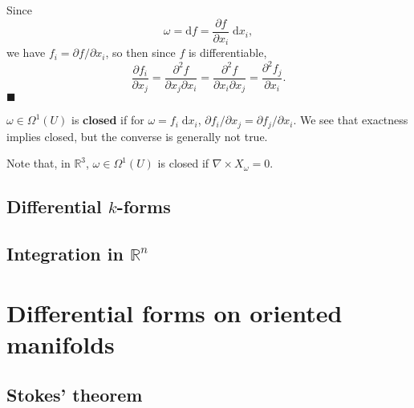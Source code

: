\documentclass[letter-paper]{tufte-book}
\newenvironment{proof}[1][Proof]{\begin{trivlist}
\item[\hskip \labelsep {\bfseries #1}]}{\end{trivlist}}
\newcommand{\qed}{\hfill$\blacksquare$}
\begin{document}
\begin{proof}
  Since
  \begin{equation*}
    \omega = \mathrm{d}f = \frac{\partial f}{\partial x_i}\; \mathrm{d}x_i,
  \end{equation*}
  we have $f_i = \partial f/ \partial x_i$, so then since $f$ is differentiable,
  \begin{equation*}
    \frac{\partial f_i}{\partial x_j} = \frac{\partial^2 f}{\partial x_j \partial x_i} = \frac{\partial^2 f}{\partial x_i \partial x_j} = \frac{\partial^2 f_j}{\partial x_i}.
  \end{equation*}
  \qed
\end{proof}

$\omega \in \Omega^1(U)$ is \textbf{closed} if for $\omega = f_i\;
\mathrm{d}x_i$, $\partial f_i / \partial x_j = \partial f_j / \partial x_i$. We
see that exactness implies closed, but the converse is generally not true.

Note that, in $\mathbb{R}^3$, $\omega \in \Omega^1(U)$ is closed if $\nabla
\times X_\omega = 0$.


\section{Differential $k$-forms}


\section{Integration in $\mathbb{R}^n$}


\chapter{Differential forms on oriented manifolds}


\section{Stokes' theorem}

\end{document}

